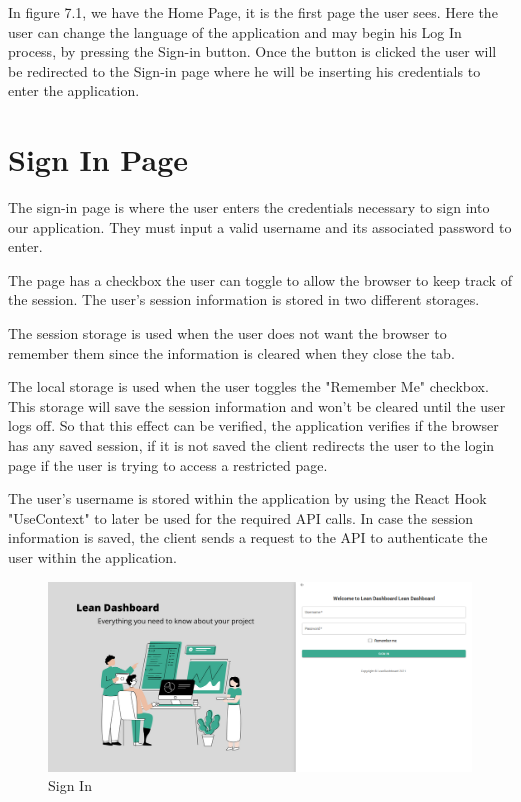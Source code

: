 \documentclass[a4paper,twoside,10pt]{report}
\begin{document}
In figure 7.1, we have the Home Page, it is the first page the user sees. Here the user can change the language of the application and may begin his Log In process, by pressing the Sign-in button. Once the button is clicked the user will be redirected to the Sign-in page where he will be inserting his credentials to enter the application.


\section{Sign In Page}
The sign-in page is where the user enters the credentials necessary to sign into our application.
They must input a valid username and its associated password to enter.

The page has a checkbox the user can toggle to allow the browser to keep track of the session. 
The user's session information is stored in two different storages.

The session storage is used when the user does not want the browser to remember them since the information is cleared when they close the tab.

The local storage is used when the user toggles the "Remember Me" checkbox. This storage will save the session information and won't be cleared until the user logs off.
So that this effect can be verified, the application verifies if the browser has any saved session, if it is not saved the client redirects the user to the login page if the user is trying to access a restricted page.

The user's username is stored within the application by using the React Hook "UseContext" to later be used for the required API calls.
In case the session information is saved, the client sends a request to the API to authenticate the user within the application.

\begin{figure}[h!]
\center
  \includegraphics[width=\textwidth]{SignIn.png}
\caption{Sign In}
\end{figure}
\end{document}
